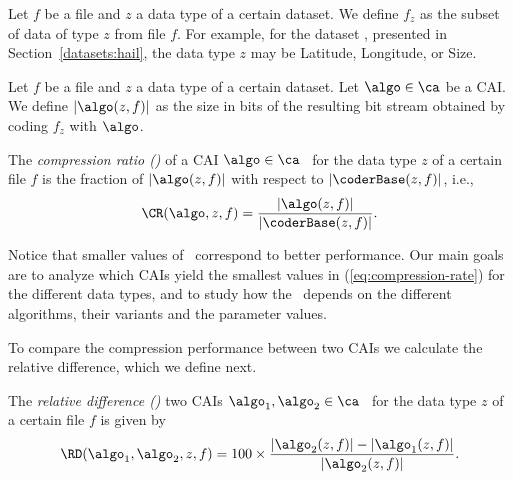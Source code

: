\vspace{+5pt}
\begin{defcion}
Let $f$ be a file and $z$ a data type of a certain dataset. We define $f_z$ as the subset of data of type $z$ from file $f$. For example, for the dataset \datasethail, presented in Section~\ref{datasets:hail}, the data type $z$ may be Latitude, Longitude, or Size.
\end{defcion}


\vspace{+2pt}
\begin{defcion}
\label{eq:coding-size}
Let $f$ be a file and $z$ a data type of a certain dataset. Let $\algo \in \ca$ be a CAI. We define $|\algo(z, f)|$ as the size in bits of the resulting bit stream obtained by coding $f_z$ with $\algo$.
\end{defcion}


\vspace{+2pt}
\begin{defcion}
\label{def:compression-rate}
The \textit{compression ratio (\CRit)} of a CAI $\algo \in \ca$ \ for the data type $z$ of a certain file $f$ is the fraction of $|\algo(z, f)|$ with respect to $|\coderBase(z, f)|$, i.e.,
\vspace{-5pt}
\begin{equation}
\label{eq:compression-rate}
\CR(\algo, z, f) = \frac{|\algo(z, f)|}{|\coderBase(z, f)|}.
\end{equation}
\end{defcion}


Notice that smaller values of \CR\ correspond to better performance. Our main goals are to analyze which CAIs yield the smallest values in (\ref{eq:compression-rate}) for the different data types, and to study how the \CR\ depends on the different algorithms, their variants and the parameter values.


\clearpage


To compare the compression performance between two CAIs we calculate the relative difference, which we define next.


\vspace{+5pt}
\begin{defcion}
\label{relative-difference}
The \textit{relative difference (\RDit)} two CAIs $\algo_1, \algo_2 \in {\ca}$ \ for the data type $z$ of a certain file $f$ is given by
\vspace{-5pt}
\begin{equation}
\label{eq:relative-difference}
\RD(\algo_1, \algo_2, z, f)  =
100\times\frac{|\algo_2 (z, f)| - |\algo_1 (z, f)|}{ |\algo_2 (z, f)| }.
\end{equation}
\end{defcion}


